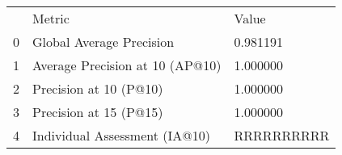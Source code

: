\begin{tabular}{lll}
 & Metric & Value \\
0 & Global Average Precision & 0.981191 \\
1 & Average Precision at 10 (AP@10) & 1.000000 \\
2 & Precision at 10 (P@10) & 1.000000 \\
3 & Precision at 15 (P@15) & 1.000000 \\
4 & Individual Assessment (IA@10) & RRRRRRRRRR \\
\end{tabular}

